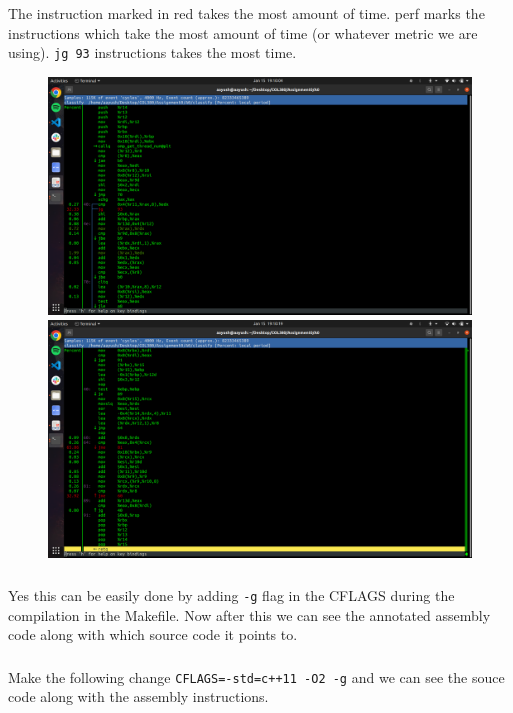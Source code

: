 \documentclass{article}
\begin{document}
\subsubsection{}
The instruction marked in red takes the most amount of time. perf marks the instructions which take the most amount of time (or whatever metric we are using). \texttt{jg 93} instructions takes the most time.
\begin{figure}[H]
\centering
\includegraphics[width=1\textwidth]{images/2_3.1.png}
\includegraphics[width=1\textwidth]{images/2_3.2.png}
\end{figure}

\subsubsection{}
Yes this can be easily done by adding \texttt{-g} flag in the CFLAGS during the compilation in the Makefile. Now after this we can see the annotated assembly code along with which source code it points to.

\subsubsection{}
Make the following change \texttt{CFLAGS=-std=c++11 -O2 -g} and we can see the souce code along with the assembly instructions.
\end{document}
